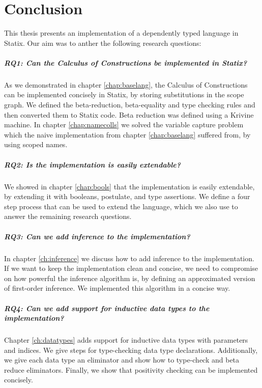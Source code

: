 \chapter{Conclusion}

This thesis presents an implementation of a dependently typed language in Statix. Our aim was to anther the following research questions:

\paragraph{RQ1: Can the Calculus of Constructions be implemented in Statix?}
As we demonstrated in chapter \ref{chap:baselang}, the Calculus of Constructions can be implemented concisely in Statix, by storing substitutions in the scope graph. We defined the beta-reduction, beta-equality and type checking rules and then converted them to Statix code. Beta reduction was defined using a Krivine machine. In chapter \ref{chap:namecolls} we solved the variable capture problem which the naive implementation from chapter \ref{chap:baselang} suffered from, by using scoped names.

\paragraph{RQ2: Is the implementation is easily extendable?}
We showed in chapter \ref{chap:bools} that the implementation is easily extendable, by extending it with booleans, postulate, and type assertions. We define a four step process that can be used to extend the language, which we also use to answer the remaining research questions.

\paragraph{RQ3: Can we add inference to the implementation?}
In chapter \ref{ch:inference} we discuss how to add inference to the implementation. If we want to keep the implementation clean and concise, we need to compromise on how powerful the inference algorithm is, by defining an approximated version of first-order inference. We implemented this algorithm in a concise way.

\paragraph{RQ4: Can we add support for inductive data types to the implementation?}
Chapter \ref{ch:datatypes} adds support for inductive data types with parameters and indices. We give steps for type-checking data type declarations. Additionally, we give each data type an eliminator and show how to type-check and beta reduce eliminators. Finally, we show that positivity checking can be implemented concisely.


